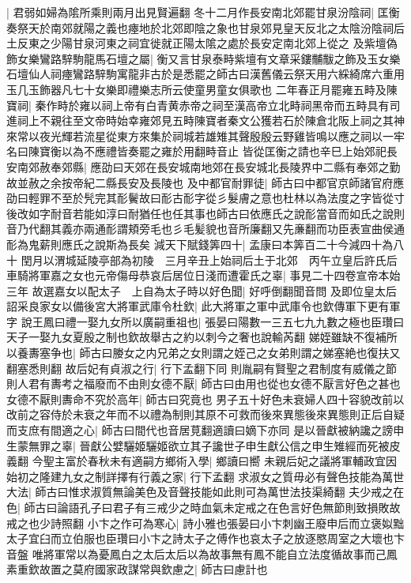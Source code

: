 |{
	君弱如婦為隂所乘則兩月出見賢遍翻}
冬十二月作長安南北郊罷甘泉汾陰祠|{
	匡衡奏祭天於南郊就陽之義也瘞地於北郊即陰之象也甘泉郊見皇天反北之太陰汾陰祠后土反東之少陽甘泉河東之祠宜徙就正陽太隂之處於長安定南北郊上從之}
及紫壇偽飾女樂鸞路騂駒龍馬石壇之屬|{
	衡又言甘泉泰畤紫壇有文章采鏤黼黻之飾及玉女樂石壇仙人祠瘞鸞路騂駒寓龍非古於是悉罷之師古曰漢舊儀云祭天用六綵綺席六重用玉几玉飾器凡七十女樂即禮樂志所云使童男童女俱歌也}
二年春正月罷雍五畤及陳寶祠|{
	秦作畤於雍以祠上帝有白青黄赤帝之祠至漢高帝立北畤祠黑帝而五畤具有司進祠上不親往至文帝時始幸雍郊見五畤陳寶者秦文公獲若石於陳倉北阪上祠之其神來常以夜光輝若流星從東方來集於祠城若雄雉其聲殷殷云野雞皆鳴以應之祠以一牢名曰陳寶衡以為不應禮皆奏罷之雍於用翻畤音止}
皆從匡衡之請也辛巳上始郊祀長安南郊赦奉郊縣|{
	應劭曰天郊在長安城南地郊在長安城北長陵界中二縣有奉郊之勤故並赦之余按帝紀二縣長安及長陵也}
及中都官耐罪徒|{
	師古曰中都官京師諸官府應劭曰輕罪不至於髠完其耏鬢故曰耏古耏字從彡髮膚之意也杜林以為法度之字皆從寸後改如字耐音若能如淳曰耐猶任也任其事也師古曰依應氏之說耏當音而如氏之說則音乃代翻其義亦兩通耏謂頬旁毛也彡毛髪貌也音所廉翻又先亷翻而功臣表宣曲侯通耏為鬼薪則應氏之說斯為長矣}
減天下賦錢筭四十|{
	孟康曰本筭百二十今減四十為八十}
閏月以渭城延陵亭部為初陵　三月辛丑上始祠后土于北郊　丙午立皇后許氏后車騎將軍嘉之女也元帝傷母恭哀后居位日淺而遭霍氏之辜|{
	事見二十四卷宣帝本始三年}
故選嘉女以配太子　上自為太子時以好色聞|{
	好呼倒翻聞音問}
及即位皇太后詔采良家女以備後宮大將軍武庫令杜欽|{
	此大將軍之軍中武庫令也欽傳軍下更有軍字}
說王鳳曰禮一娶九女所以廣嗣重祖也|{
	張晏曰陽數一三五七九九數之極也臣瓚曰天子一娶九女夏殷之制也欽故舉古之約以刺今之奢也說輸芮翻}
娣姪雖缺不復補所以養夀塞争也|{
	師古曰媵女之内兄弟之女則謂之姪己之女弟則謂之娣塞絶也復扶又翻塞悉則翻}
故后妃有貞淑之行|{
	行下孟翻下同}
則胤嗣有賢聖之君制度有威儀之節則人君有夀考之福廢而不由則女德不厭|{
	師古曰由用也從也女德不厭言好色之甚也}
女德不厭則夀命不究於高年|{
	師古曰究竟也}
男子五十好色未衰婦人四十容貌改前以改前之容侍於未衰之年而不以禮為制則其原不可救而後來異態後來異態則正后自疑而支庶有間適之心|{
	師古曰間代也音居莧翻適讀曰嫡下亦同}
是以晉獻被納讒之謗申生蒙無罪之辜|{
	晉獻公嬖驪姬驪姬欲立其子讒世子申生獻公信之申生雉經而死被皮義翻}
今聖主富於春秋未有適嗣方鄉術入學|{
	鄉讀曰嚮}
未親后妃之議將軍輔政宜因始初之隆建九女之制詳擇有行義之家|{
	行下孟翻}
求淑女之質毋必有聲色技能為萬世大法|{
	師古曰惟求淑質無論美色及音聲技能如此則可為萬世法技渠綺翻}
夫少戒之在色|{
	師古曰論語孔子曰君子有三戒少之時血氣未定戒之在色言好色無節則致損敗故戒之也少詩照翻}
小卞之作可為寒心|{
	詩小雅也張晏曰小卞刺幽王廢申后而立褒姒黜太子宜臼而立伯服也臣瓚曰小卞之詩太子之傅作也哀太子之放逐愍周室之大壞也卞音盤}
唯將軍常以為憂鳳白之太后太后以為故事無有鳳不能自立法度循故事而己鳳素重欽故置之莫府國家政謀常與欽慮之|{
	師古曰慮計也}
